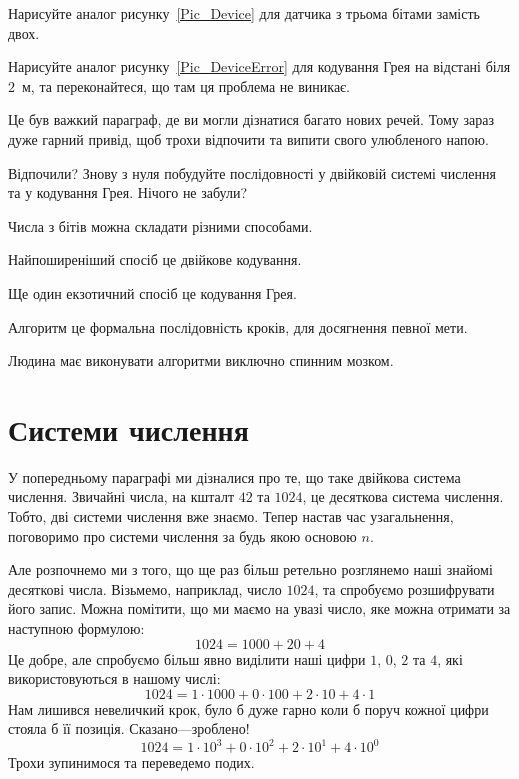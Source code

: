 \begin{exercise}
Нарисуйте аналог рисунку~\ref{Pic_Device} для датчика з трьома бітами замість двох.
\end{exercise}

\begin{exercise}
Нарисуйте аналог рисунку~\ref{Pic_DeviceError} для кодування Грея на відстані біля $2$~м, та переконайтеся, що там ця проблема не виникає.
\end{exercise}

\begin{exercise}
Це був важкий параграф, де ви могли дізнатися багато нових речей. Тому зараз дуже гарний привід, щоб трохи відпочити та випити свого улюбленого напою.
\end{exercise}

\begin{exercise}
Відпочили? Знову з нуля побудуйте послідовності у двійковій системі числення та у кодування Грея. Нічого не забули?
\end{exercise}

\begin{summary}
\item Числа з бітів можна складати різними способами.
\item Найпоширеніший спосіб це двійкове кодування.
\item Ще один екзотичний спосіб це кодування Грея.
\item Алгоритм це формальна послідовність кроків, для досягнення певної мети.
\item Людина має виконувати алгоритми виключно спинним мозком.
\end{summary}

\section{Системи числення}

У попередньому параграфі ми дізналися про те, що таке двійкова система числення.
Звичайні числа, на кшталт $42$ та $1024$, це десяткова система числення.
Тобто, дві системи числення вже знаємо.
Тепер настав час узагальнення, поговоримо про системи числення за будь якою основою $n$.

Але розпочнемо ми з того, що ще раз більш ретельно розглянемо наші знайомі десяткові числа.
Візьмемо, наприклад, число $1024$, та спробуємо розшифрувати його запис.
Можна помітити, що ми маємо на увазі число, яке можна отримати за наступною формулою:
$$ 1024 = 1000 + 20 + 4 $$
Це добре, але спробуємо більш явно виділити наші цифри $1$, $0$, $2$ та $4$, які використовуються в нашому числі:
$$ 1024 = 1 \cdot 1000 + 0 \cdot 100 + 2 \cdot 10 + 4 \cdot 1 $$
Нам лишився невеличкий крок, було б дуже гарно коли б поруч кожної цифри стояла б її позиція.
Сказано---зроблено!
$$ 1024 = 1 \cdot 10^3 + 0 \cdot 10^2 + 2 \cdot 10^1 + 4 \cdot 10^0 $$
Трохи зупинимося та переведемо подих.

